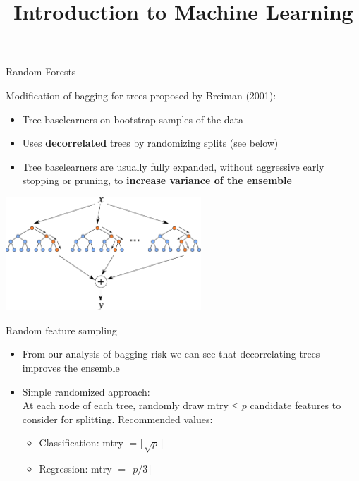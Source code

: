 \documentclass[11pt,compress,t,notes=noshow, xcolor=table]{beamer}
\title{Introduction to Machine Learning}
\institute{\href{https://compstat-lmu.github.io/lecture_i2ml/}{compstat-lmu.github.io/lecture\_i2ml}}
\date{}
\begin{document}












\sloppy

\begin{vbframe}{Random Forests}

Modification of bagging for trees proposed by Breiman (2001):

\begin{itemize}
  \item Tree baselearners on bootstrap samples of the data
  \item Uses \textbf{decorrelated} trees by randomizing splits (see below)
  \item Tree baselearners are usually fully expanded, without aggressive early stopping or
    pruning, to \textbf{increase variance of the ensemble}
\end{itemize}
\begin{center}
\includegraphics[width=0.55\textwidth]{figure_man/forest.png}
\end{center}
\end{vbframe}



\begin{vbframe}{Random feature sampling}

\begin{itemize}
  \item From our analysis of bagging risk we can see that decorrelating trees improves the ensemble
  \item Simple randomized approach:\\
    At each node of each tree, randomly draw $\text{mtry} \le p$ candidate features to consider for splitting. Recommended values:
  \begin{itemize}
    \item Classification: mtry $ = \lfloor \sqrt{p} \rfloor$
    \item Regression: mtry $ = \lfloor p/3 \rfloor$
  \end{itemize}
\end{itemize}
\end{vbframe}
\end{document}
